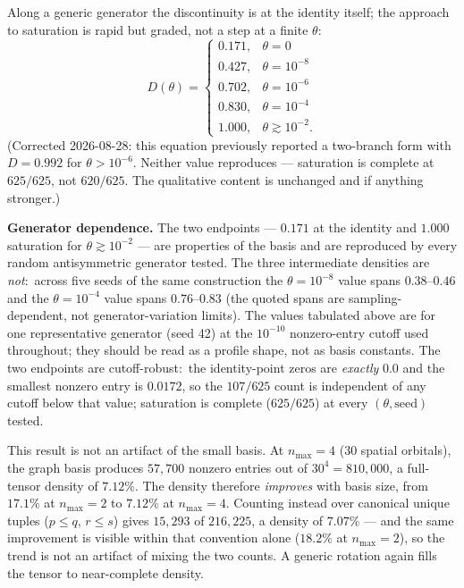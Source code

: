 \documentclass[twocolumn,pra,amsmath,amssymb,superscriptaddress]{revtex4-2}
\newcommand{\gvq}[2]{#2}
\begin{document}
Along a generic generator the discontinuity is at the identity itself; the approach to
saturation is rapid but graded, not a step at a finite $\theta$:
\begin{equation}
  D(\theta) =
  \begin{cases}
    0.171,  & \theta = 0 \\
    0.427,  & \theta = 10^{-8} \\
    0.702,  & \theta = 10^{-6} \\
    0.830,  & \theta = 10^{-4} \\
    1.000,  & \theta \gtrsim 10^{-2}.
  \end{cases}
  \label{eq:step}
\end{equation}
(Corrected 2026-08-28: this equation previously reported a
two-branch form with $D = 0.992$ for $\theta > 10^{-6}$.  Neither
value reproduces --- saturation is complete at $625/625$, not
$620/625$.  The qualitative content is unchanged and if anything
stronger.)

\textbf{Generator dependence.}  The two endpoints --- $0.171$ at the
identity and $1.000$ saturation for $\theta \gtrsim 10^{-2}$ --- are
properties of the basis and are reproduced by every random
antisymmetric generator tested.  The three intermediate densities
are \emph{not}:\ across five seeds of the same construction the
$\theta = 10^{-8}$ value spans $0.38$--$0.46$ and the
$\theta = 10^{-4}$ value spans $0.76$--$0.83$ (the quoted spans are
sampling-dependent, not generator-variation limits).  The values
tabulated above are for one representative generator (seed 42) at
the $10^{-10}$ nonzero-entry cutoff used throughout; they should be
read as a profile shape, not as basis constants.  The two endpoints
are cutoff-robust:\ the identity-point zeros are \emph{exactly}
$0.0$ and the smallest nonzero entry is $0.0172$, so the $\gvq{block_sp_n2_eri}{107}/625$
count is independent of any cutoff below that value; saturation is
complete ($625/625$) at every $(\theta, \text{seed})$ tested.

This result is not an artifact of the small basis.  At
$n_{\max} = 4$ (30 spatial orbitals), the graph basis produces
$57{,}700$ nonzero entries out of $30^4 = 810{,}000$, a full-tensor
density of $7.12\%$.  The density therefore \emph{improves} with
basis size, from $17.1\%$ at $n_{\max} = 2$ to $7.12\%$ at
$n_{\max} = 4$.  Counting instead over canonical unique tuples
($p \le q$, $r \le s$) gives $15{,}293$ of $216{,}225$, a density of
$7.07\%$ --- and the same improvement is visible within that
convention alone ($18.2\%$ at $n_{\max} = 2$), so the trend is not
an artifact of mixing the two counts.  A generic rotation again
fills the tensor to near-complete density.
\end{document}
